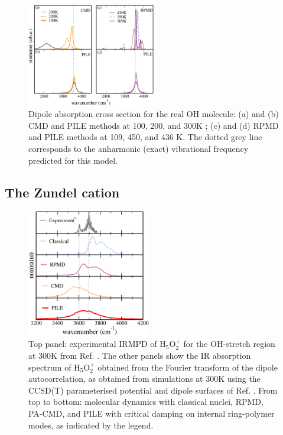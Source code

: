 \documentclass[aps,prb,superscriptaddress,amsmath,amssymb,showpacs,twocolumn]{revtex4}
\begin{document}
\begin{figure}[htbp]
\centering
\includegraphics[width=0.5\textwidth]{figures/comparison_ohanharm_factors.pdf}
\caption{Dipole absorption cross section for the real OH molecule: (a) and (b) CMD and PILE methods at 100, 200, and 300K ; (c)  and (d) RPMD and PILE methods at 109, 450, and 436 K. The dotted grey line corresponds to the anharmonic (exact) vibrational frequency predicted for this model.}
\label{fig:oh-rpmd-cmd-pile}
\end{figure}


\subsection{The Zundel cation}

\begin{figure}[htbp]
\centering\includegraphics[width=0.48\textwidth]{figures/oh-stretch-300K.pdf}
\caption{Top panel: experimental IRMPD of H$_5$O$_2^+$ for the OH-stretch region at 300K from Ref. \cite{YehLee1989}.
The other panels show the IR absorption spectrum of H$_5$O$_2^+$ obtained from the Fourier transform of 
the dipole autocorrelation, as obtained from simulations at 300K using the CCSD(T) parameterised potential 
and dipole surfaces of Ref. \cite{HuangBraamsBowman2005}. From top to bottom:
 molecular dynamics with classical nuclei, RPMD, PA-CMD, and PILE with critical damping on internal ring-polymer modes,
as indicated by the legend.}
\label{fig:zundel-highf}
\end{figure}
\end{document}
